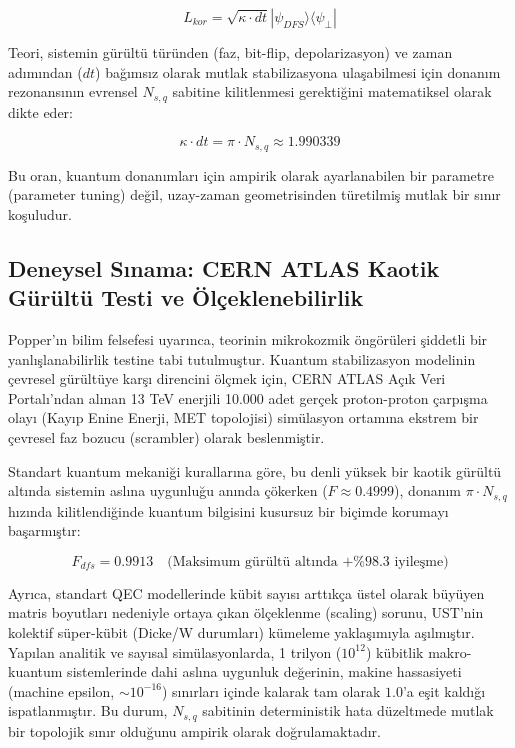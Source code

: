 \documentclass[12pt,a4paper]{article}
\begin{document}
\begin{equation}
L_{kor} = \sqrt{\kappa \cdot dt}|\psi_{DFS}\rangle\langle\psi_\perp|
\end{equation}

Teori, sistemin gürültü türünden (faz, bit-flip, depolarizasyon) ve zaman adımından ($dt$) bağımsız olarak mutlak stabilizasyona ulaşabilmesi için donanım rezonansının evrensel $N_{s,q}$ sabitine kilitlenmesi gerektiğini matematiksel olarak dikte eder:

\begin{equation}
\kappa \cdot dt = \pi \cdot N_{s,q} \approx 1.990339
\end{equation}

Bu oran, kuantum donanımları için ampirik olarak ayarlanabilen bir parametre (parameter tuning) değil, uzay-zaman geometrisinden türetilmiş mutlak bir sınır koşuludur.

\subsection{Deneysel Sınama: CERN ATLAS Kaotik Gürültü Testi ve Ölçeklenebilirlik}
Popper'ın bilim felsefesi uyarınca, teorinin mikrokozmik öngörüleri şiddetli bir yanlışlanabilirlik testine tabi tutulmuştur. Kuantum stabilizasyon modelinin çevresel gürültüye karşı direncini ölçmek için, CERN ATLAS Açık Veri Portalı'ndan alınan 13 TeV enerjili 10.000 adet gerçek proton-proton çarpışma olayı (Kayıp Enine Enerji, MET topolojisi) simülasyon ortamına ekstrem bir çevresel faz bozucu (scrambler) olarak beslenmiştir.

Standart kuantum mekaniği kurallarına göre, bu denli yüksek bir kaotik gürültü altında sistemin aslına uygunluğu anında çökerken ($F \approx 0.4999$), donanım $\pi \cdot N_{s,q}$ hızında kilitlendiğinde kuantum bilgisini kusursuz bir biçimde korumayı başarmıştır:

\begin{equation}
F_{dfs} = 0.9913 \quad \text{(Maksimum gürültü altında +\%98.3 iyileşme)}
\end{equation}

Ayrıca, standart QEC modellerinde kübit sayısı arttıkça üstel olarak büyüyen matris boyutları nedeniyle ortaya çıkan ölçeklenme (scaling) sorunu, UST'nin kolektif süper-kübit (Dicke/W durumları) kümeleme yaklaşımıyla aşılmıştır. Yapılan analitik ve sayısal simülasyonlarda, 1 trilyon ($10^{12}$) kübitlik makro-kuantum sistemlerinde dahi aslına uygunluk değerinin, makine hassasiyeti (machine epsilon, $\sim 10^{-16}$) sınırları içinde kalarak tam olarak $1.0$'a eşit kaldığı ispatlanmıştır. Bu durum, $N_{s,q}$ sabitinin deterministik hata düzeltmede mutlak bir topolojik sınır olduğunu ampirik olarak doğrulamaktadır.
\end{document}
